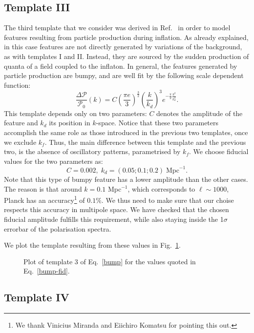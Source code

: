 \documentclass[12pt]{article}
\newcommand{\be}{\begin{equation}}
\newcommand{\ee}{\end{equation}}
\begin{document}
\subsection{Template III}

The third template that we consider was derived in Ref.~\cite{Barnaby:2009mc} in order to model features resulting from particle production during inflation. As already explained, in this case features are not directly generated by variations of the background, as with templates I and II. Instead, they are sourced by the sudden production of quanta of a field coupled to the inflaton. In general, the features generated by particle production are bumpy, and are well fit by the following scale dependent function:
%
\be \label{bump}
\frac{\Delta \mathcal P}{\mathcal P_0 } (k) = C\left(\frac{\pi e}{3}\right)^{\frac{3}{2}}\left(\frac{k}{k_d}\right)^3 e^{-\frac{\pi}{2}\frac{k^2}{k_d^2}}.
\ee
%
This template depends only on two parameters: $C$ denotes the amplitude of the feature and $k_d$ its position in $k$-space. Notice that these two parameters accomplish the same role as those introduced in the previous two templates, once we exclude $k_f$. Thus, the main difference between this template and the previous two, is the absence of oscillatory patterns, parametrised by $k_f$.  We choose fiducial values for the two parameters as:
%
\be \label{bump-fid}
C= 0.002, \; k_d = (0.05;0.1;0.2) \; \text{Mpc}^{-1}.
\ee
Note that this type of bumpy feature has a lower amplitude than the other cases. The reason is that around $k=0.1$ Mpc$^{-1}$, which corresponds to $\ell\sim1000$, Planck has an accuracy\footnote{We thank Vinicius Miranda and Eiichiro Komatsu for pointing this out.} of $0.1\%$. We thus need to make sure that our choise respects this accuracy in multipole space. We have checked that the chosen fiducial amplitude fulfills this requirement, while also staying inside the 1$\sigma$ errorbar of the polarisation spectra.

We plot the template resulting from these values in Fig.~\ref{fig:temp3}.
%
\begin{figure}[h]
\centering
{}
\caption{Plot of template 3 of Eq.~\eqref{bump} for the values quoted in Eq.~\eqref{bump-fid}.}
\label{fig:temp3}
\end{figure}
%



\subsection{Template IV}
\end{document}
